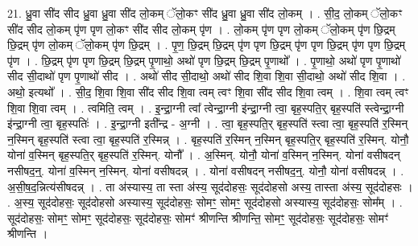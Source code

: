 \documentclass[17pt]{extarticle}
\begin{document}
21. ध्रु॒वा सी॑द सीद ध्रु॒वा ध्रु॒वा सी॑द लो॒कम् ॅलो॒कꣳ सी॑द ध्रु॒वा ध्रु॒वा सी॑द लो॒कम् । . सी॒द॒ लो॒कम् ॅलो॒कꣳ सी॑द सीद लो॒कम् पृ॑ण पृण लो॒कꣳ सी॑द सीद लो॒कम् पृ॑ण । . लो॒कम् पृ॑ण पृण लो॒कम् ॅलो॒कम् पृ॑ण छि॒द्रम् छि॒द्रम् पृ॑ण लो॒कम् ॅलो॒कम् पृ॑ण छि॒द्रम् । . पृ॒ण॒ छि॒द्रम् छि॒द्रम् पृ॑ण पृण छि॒द्रम् पृ॑ण पृण छि॒द्रम् पृ॑ण पृण छि॒द्रम् पृ॑ण । . छि॒द्रम् पृ॑ण पृण छि॒द्रम् छि॒द्रम् पृ॒णाथो॒ अथो॑ पृण छि॒द्रम् छि॒द्रम् पृ॒णाथो᳚ । . पृ॒णाथो॒ अथो॑ पृण पृ॒णाथो॑ सीद सी॒दाथो॑ पृण पृ॒णाथो॑ सीद । . अथो॑ सीद सी॒दाथो॒ अथो॑ सीद शि॒वा शि॒वा सी॒दाथो॒ अथो॑ सीद शि॒वा । . अथो॒ इत्यथो᳚ । . सी॒द॒ शि॒वा शि॒वा सी॑द सीद शि॒वा त्वम् त्वꣳ शि॒वा सी॑द सीद शि॒वा त्वम् । . शि॒वा त्वम् त्वꣳ शि॒वा शि॒वा त्वम् । . त्वमिति॒ त्वम् । . इ॒न्द्रा॒ग्नी त्वा᳚ त्वेन्द्रा॒ग्नी इ॑न्द्रा॒ग्नी त्वा॒ बृह॒स्पति॒र् बृह॒स्पति॑ स्त्वेन्द्रा॒ग्नी इ॑न्द्रा॒ग्नी त्वा॒ बृह॒स्पतिः॑ । . इ॒न्द्रा॒ग्नी इती᳚न्द्र - अ॒ग्नी । . त्वा॒ बृह॒स्पति॒र् बृह॒स्पति॑ स्त्वा त्वा॒ बृह॒स्पति॑ र॒स्मिन् न॒स्मिन् बृह॒स्पति॑ स्त्वा त्वा॒ बृह॒स्पति॑ र॒स्मिन्न् । . बृह॒स्पति॑ र॒स्मिन् न॒स्मिन् बृह॒स्पति॒र् बृह॒स्पति॑ र॒स्मिन्. योनौ॒ योना॑ व॒स्मिन् बृह॒स्पति॒र् बृह॒स्पति॑ र॒स्मिन्. योनौ᳚ । . अ॒स्मिन्. योनौ॒ योना॑ व॒स्मिन् न॒स्मिन्. योना॑ वसीषदन् नसीषद॒न्॒. योना॑ व॒स्मिन् न॒स्मिन्. योना॑ वसीषदन्न् । . योना॑ वसीषदन् नसीषद॒न्॒. योनौ॒ योना॑ वसीषदन्न् । . अ॒सी॒ष॒द॒न्नित्य॑सीषदन्न् । . ता अ॑स्यास्य॒ ता स्ता अ॑स्य॒ सूद॑दोहसः॒ सूद॑दोहसो अस्य॒ तास्ता अ॑स्य॒ सूद॑दोहसः । . अ॒स्य॒ सूद॑दोहसः॒ सूद॑दोहसो अस्यास्य॒ सूद॑दोहसः॒ सोमꣳ॒॒ सोमꣳ॒॒ सूद॑दोहसो अस्यास्य॒ सूद॑दोहसः॒ सोम᳚म् । . सूद॑दोहसः॒ सोमꣳ॒॒ सोमꣳ॒॒ सूद॑दोहसः॒ सूद॑दोहसः॒ सोमꣳ॑ श्रीणन्ति श्रीणन्ति॒ सोमꣳ॒॒ सूद॑दोहसः॒ सूद॑दोहसः॒ सोमꣳ॑ श्रीणन्ति । \newline
\end{document}
